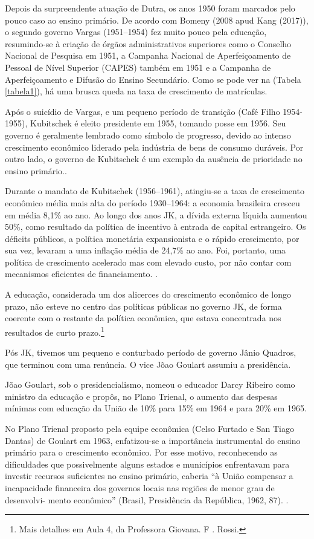 \documentclass[a4paper,12pt]{article}
\begin{document}
Depois da surpreendente atuação de Dutra, os anos 1950 foram marcados pelo pouco caso ao ensino primário. De acordo com Bomeny (2008 apud Kang (2017)), o segundo governo Vargas (1951–1954) fez muito pouco pela educação, resumindo-se à criação de órgãos administrativos superiores como o Conselho Nacional de Pesquisa em 1951, a Campanha Nacional de Aperfeiçoamento de Pessoal de Nível Superior (CAPES) também em 1951 e a Campanha de Aperfeiçoamento e Difusão do Ensino Secundário.
Como se pode ver na (Tabela \ref{tabela1}), há uma brusca queda na taxa de crescimento de matrículas.

Após o suicídio de Vargas, e um pequeno período de transição (Café Filho 1954-1955), Kubitschek é eleito presidente em 1955, tomando posse em 1956.
Seu governo é geralmente lembrado como símbolo de progresso, devido ao intenso crescimento econômico liderado pela indústria de bens de consumo duráveis.
Por outro lado, o governo de Kubitschek é um exemplo da ausência de prioridade no ensino primário.\cite{kang}.

Durante o mandato de Kubitschek (1956–1961), atingiu-se a taxa de crescimento econômico média mais alta do período 1930–1964: a economia brasileira cresceu em média 8,1\% ao ano.
Ao longo dos anos JK, a dívida externa líquida aumentou 50\%, como resultado da política de incentivo à entrada de capital estrangeiro.
Os déficits públicos, a política monetária expansionista e o rápido crescimento, por sua vez, levaram a uma inflação média de 24,7\% ao ano.
Foi, portanto, uma política de crescimento acelerado mas com elevado custo, por não contar com mecanismos eficientes de financiamento. \cite{kang}.

A educação, considerada um dos alicerces do crescimento econômico de longo prazo, não esteve no centro das políticas públicas no governo JK, de forma coerente com o restante da política econômica, que estava concentrada nos resultados de curto prazo.\footnote{Mais detalhes em Aula 4, da Professora Giovana. F . Rossi.}

Pós JK, tivemos um pequeno e conturbado período de governo Jânio Quadros, que terminou com uma renúncia. O vice Jõao Goulart assumiu a presidência.

Jõao Goulart, sob o presidencialismo, nomeou o educador Darcy Ribeiro como ministro da educação e propôs, no Plano Trienal, o aumento das despesas mínimas com educação da União de 10\% para 15\% em 1964 e para 20\% em 1965.

\begin{citacao}
    No Plano Trienal proposto pela equipe econômica (Celso Furtado e San Tiago Dantas) de Goulart em 1963, enfatizou-se a importância instrumental do ensino primário para o crescimento econômico. Por esse motivo, reconhecendo as dificuldades que possivelmente alguns estados e municípios enfrentavam para investir recursos suficientes no ensino primário, caberia “à União compensar a incapacidade financeira dos governos locais nas regiões de menor grau de desenvolvi- mento econômico” (Brasil, Presidência da República, 1962, 87). \cite{kang}.
\end{citacao}
\end{document}
